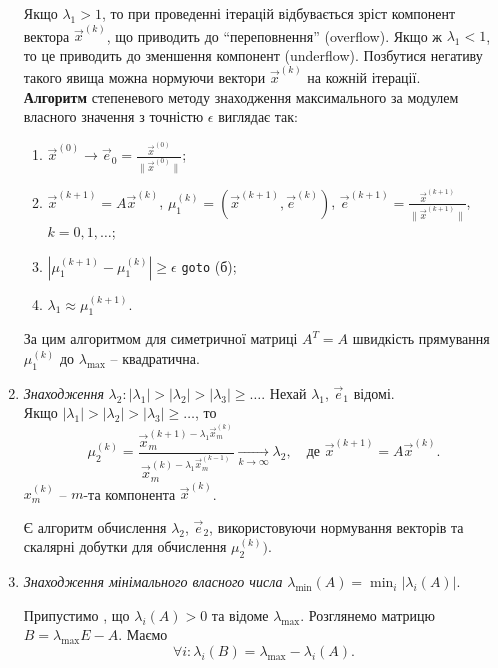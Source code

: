 \begin{enumerate}
	Якщо $\lambda_1 > 1$, то при проведенні ітерацій відбувається зріст компонент вектора $\vec x^{(k)}$, що приводить до ``переповнення'' (overflow). Якщо ж $\lambda_1 < 1$, то це приводить до зменшення компонент (underflow). Позбутися негативу такого явища можна нормуючи вектори $\vec x^{(k)}$ на кожній ітерації. \\

	\textbf{Алгоритм} степеневого методу знаходження максимального за модулем власного значення з точністю $\epsilon$ виглядає так:
	\begin{enumerate}
		\item $\vec x^{(0)} \to \vec e_0 = \frac{\vec x^{(0)}}{\|\vec x^{(0)}\|}$;

		\item $\vec x^{(k+1)} = A \vec x^{(k)}$, $\mu_1^{(k)} = (\vec x^{(k+1)}, \vec e^{(k)})$, $\vec e^{(k+1)} = \frac{\vec x^{(k+1)}}{\|\vec x^{(k+1)}\|}$, $k = 0,1,\ldots$;

		\item $|\mu_1^{(k+1)} - \mu_1^{(k)}| \ge \epsilon$ \verb|goto| (б);

		\item $\lambda_1 \approx \mu_1^{(k+1)}$.
	\end{enumerate}

	За цим алгоритмом для симетричної матриці $A^T = A$ швидкість прямування $\mu_1^{(k)}$ до $\lambda_{\max}$ -- квадратична.

	\item \textit{Знаходження} $\lambda_2: |\lambda_1| > |\lambda_2| > |\lambda_3| \ge \ldots$. Нехай $\lambda_1$, $\vec e_1$ відомі. \\

	Якщо $|\lambda_1| > |\lambda_2| > |\lambda_3| \ge \ldots$, то
		\[ \mu_2^{(k)} = \dfrac{\vec x_m^{(k+1) - \lambda_1 \vec x_m^{(k)}}}{\vec x_m^{(k) - \lambda_1 \vec x_m^{(k-1)}}} \xrightarrow[k\to\infty]{} \lambda_2, \quad \text{де } \vec x^{(k+1)} = A \vec x^{(k)}. \]
		$x_m^{(k)}$ -- $m$-та компонента $\vec x^{(k)}$.

	Є алгоритм обчислення $\lambda_2$, $\vec e_2$, використовуючи нормування векторів та скалярні добутки для обчислення $\mu_2^{(k)})$.


	\item \textit{Знаходження мінімального власного числа} $\lambda_{\min}(A) = \min_i |\lambda_i(A)|$.

	Припустимо , що $\lambda_i(A) > 0$ та відоме $\lambda_{\max}$. Розглянемо матрицю $B = \lambda_{\max} E - A$. Маємо \[ \forall i: \lambda_i(B) = \lambda_{\max} - \lambda_i(A). \]


\end{enumerate}
